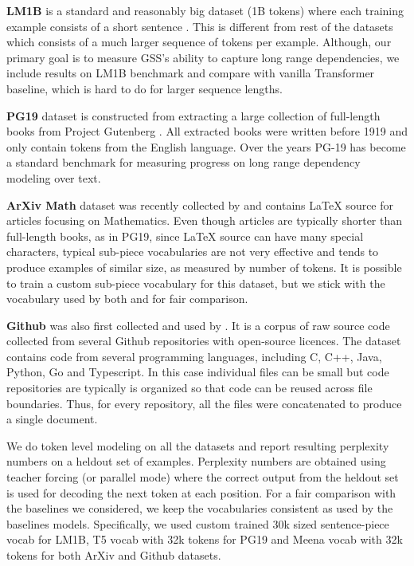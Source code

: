 \textbf{LM1B} is a standard and reasonably big dataset (1B tokens) where each training example consists of a short sentence \citep{lm1b_DBLP:journals/corr/ChelbaMSGBK13}. This is different from rest of the datasets which consists of a much larger sequence of tokens per example. Although, our primary goal is to measure GSS's ability to capture long range dependencies, we include results on LM1B benchmark and compare with vanilla Transformer baseline, which is hard to do for larger sequence lengths.

\textbf{PG19} dataset is constructed from extracting a large collection of full-length books from Project Gutenberg \citep{pg19_raecompressive2019}. All extracted books were written before 1919 and only contain tokens from the English language. Over the years PG-19 has become a standard benchmark for measuring progress on long range dependency modeling over text.

\textbf{ArXiv Math} dataset was recently collected by \cite{wu2022memorizing} and contains LaTeX source for articles focusing on Mathematics. Even though articles are typically shorter than full-length books, as in PG19, since LaTeX source can have many special characters, typical sub-piece vocabularies are not very effective and tends to produce examples of similar size, as measured by number of tokens. It is possible to train a custom sub-piece vocabulary for this dataset, but we stick with the vocabulary used by both \cite{wu2022memorizing} and \cite{hutchins2022block} for fair comparison.

\textbf{Github} was also first collected and used by \cite{wu2022memorizing}. It is a corpus of raw source code collected from several Github repositories with open-source licences. The dataset contains code from several programming languages, including C, C++, Java, Python, Go and Typescript. In this case individual files can be small but code repositories are typically is organized so that code can be reused across file boundaries. Thus, for every repository, all the files were concatenated to produce a single document. 

We do token level modeling on all the datasets and report resulting perplexity numbers on a heldout set of examples. Perplexity numbers are obtained using teacher forcing (or parallel mode) where the correct output from the heldout set is used for decoding the next token at each position. For a fair comparison with the baselines we considered, we keep the vocabularies consistent as used by the baselines models. Specifically, we used custom trained 30k sized sentence-piece vocab for LM1B, T5 vocab with 32k tokens for PG19 \citep{raffel2019exploring} and Meena vocab with 32k tokens \citep{meena_adiwardana2020humanlike} for both ArXiv and Github datasets. 

